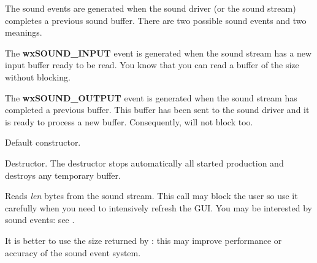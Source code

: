 The sound events are generated when the sound driver (or the sound stream) completes
a previous sound buffer. There are two possible sound events and two meanings.

The {\bf wxSOUND\_INPUT} event is generated when the sound stream has a new input
buffer ready to be read. You know that you can read a buffer of the size
 without blocking. 

The {\bf wxSOUND\_OUTPUT} event is generated when the sound stream has completed a
previous buffer. This buffer has been sent to the sound driver and it is ready to
process a new buffer. Consequently,  will not
block too.



\label{wxsoundstreamwxsoundstream}


Default constructor.

\label{wxsoundstreamdtor}


Destructor. The destructor stops automatically all started production and destroys
any temporary buffer.


\label{wxsoundstreamread}


Reads {\it len} bytes from the sound stream. This call may block the user so
use it carefully when you need to intensively refresh the GUI. You may be
interested by sound events: see . 

It is better to use the size returned by : this may improve performance or accuracy of the
sound event system.



